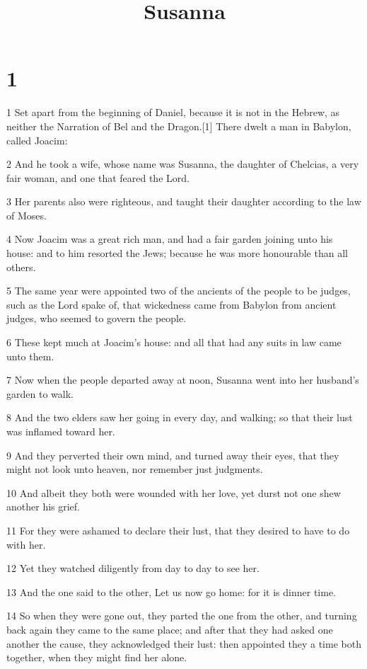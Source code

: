 

\title{Susanna}


\chapter{1}

\par 1 Set apart from the beginning of Daniel, because it is not in the Hebrew, as neither the Narration of Bel and the Dragon.[1] There dwelt a man in Babylon, called Joacim:
\par 2 And he took a wife, whose name was Susanna, the daughter of Chelcias, a very fair woman, and one that feared the Lord.
\par 3 Her parents also were righteous, and taught their daughter according to the law of Moses.
\par 4 Now Joacim was a great rich man, and had a fair garden joining unto his house: and to him resorted the Jews; because he was more honourable than all others.
\par 5 The same year were appointed two of the ancients of the people to be judges, such as the Lord spake of, that wickedness came from Babylon from ancient judges, who seemed to govern the people.
\par 6 These kept much at Joacim's house: and all that had any suits in law came unto them.
\par 7 Now when the people departed away at noon, Susanna went into her husband's garden to walk.
\par 8 And the two elders saw her going in every day, and walking; so that their lust was inflamed toward her.
\par 9 And they perverted their own mind, and turned away their eyes, that they might not look unto heaven, nor remember just judgments.
\par 10 And albeit they both were wounded with her love, yet durst not one shew another his grief.
\par 11 For they were ashamed to declare their lust, that they desired to have to do with her.
\par 12 Yet they watched diligently from day to day to see her.
\par 13 And the one said to the other, Let us now go home: for it is dinner time.
\par 14 So when they were gone out, they parted the one from the other, and turning back again they came to the same place; and after that they had asked one another the cause, they acknowledged their lust: then appointed they a time both together, when they might find her alone.

